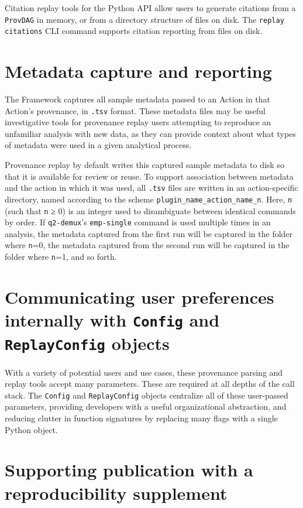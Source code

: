 Citation replay tools for the Python API allow users to generate citations from
a \texttt{ProvDAG} in memory, or from a directory structure of files on disk.
The \texttt{replay citations} CLI command supports citation reporting from files on disk.


\section{Metadata capture and reporting}

The Framework captures all sample metadata passed to an Action in that Action’s
provenance, in \texttt{.tsv} format. These metadata files may be useful investigative
tools for provenance replay users attempting to reproduce an unfamiliar analysis
with new data, as they can provide context about what types of metadata were
used in a given analytical process.

Provenance replay by default writes this captured sample metadata to disk so
that it is available for review or reuse. To support association between
metadata and the action in which it was used, all \texttt{.tsv} files are written in an
action-specific directory, named according to the scheme
\texttt{plugin\_name\_action\_name\_n}. Here, \texttt{n} (such that \texttt{n} ≥ 0) is an integer used to
disambiguate between identical commands by order. If \texttt{q2-demux}’s \texttt{emp-single}
command is used multiple times in an analysis, the metadata captured from the first
run will be captured in the folder where \texttt{n}=0, the metadata captured from the second
run will be captured in the folder where \texttt{n}=1, and so forth.


\section{Communicating user preferences internally with \texttt{Config} and \texttt{ReplayConfig} objects}

With a variety of potential users and use cases, these provenance parsing and
replay tools accept many parameters. These are required at all depths of the
call stack. The \texttt{Config} and \texttt{ReplayConfig} objects centralize all of these
user-passed parameters, providing developers with a useful organizational
abstraction, and reducing clutter in function signatures by replacing many flags
with a single Python object. 


\section{Supporting publication with a reproducibility supplement}

